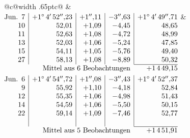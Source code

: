 \noindent\begin{tabular}{@{}c@{\hspace{.4em}\vrule width .65pt\hspace{.4em}}c@{}}
 &
 \\[.18ex]
\(\begin{array}[t]{@{}r|r|r|r|r@{}}
\text{Jun.}\enspace 7 & +1^\circ\,4'\,52''{,}23 & +1''{,}11 & -3''{,}63 & +1^\circ\,4'\,49''{,}71\\
10 & 52{,}01 & +1{,}09 & -4{,}45 & 48{,}65\\
11 & 52{,}63 & +1{,}08 & -4{,}72 & 48{,}99\\
13 & 52{,}03 & +1{,}06 & -5{,}24 & 47{,}85\\
15 & 54{,}11 & +1{,}05 & -5{,}76 & 49{,}40\\
27 & 58{,}13 & +1{,}08 & -8{,}89 & 50{,}32\\
\cline{5-5}
\multicolumn{4}{r}{\text{Mittel aus 6 Beobachtungen}} & +1\,4\,49{,}15
\end{array}\)
&
\(\begin{array}[t]{@{}r|r|r|r|r@{}}
\text{Jun.}\enspace 6 & +1^\circ\,4'\,54''{,}72 & +1''{,}08 & -3''{,}43 & +1^\circ\,4'\,52''{,}37\\
9 & 55{,}92 & +1{,}10 & -4{,}18 & 52{,}84\\
12 & 55{,}35 & +1{,}06 & -4{,}98 & 51{,}43\\
14 & 54{,}59 & +1{,}06 & -5{,}50 & 50{,}15\\
22 & 59{,}14 & +1{,}09 & -7{,}46 & 52{,}77\\
 & & & & \\
\cline{5-5}
\multicolumn{4}{r}{\text{Mittel aus 5 Beobachtungen}} & +1\,4\,51{,}91
\end{array}\)
\end{tabular}\par\medskip
{}
